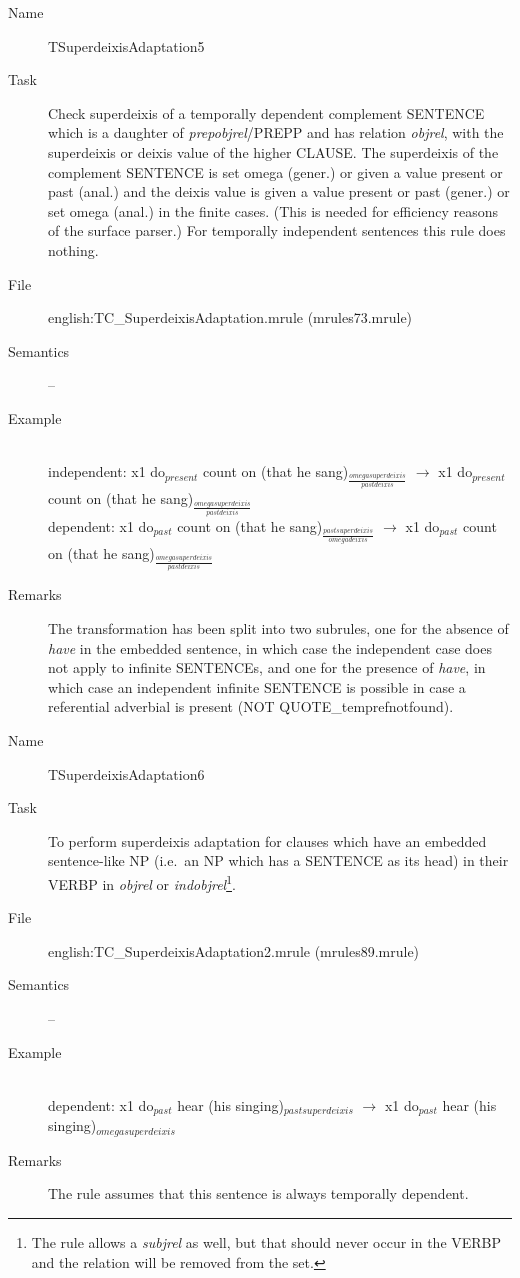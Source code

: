 \begin{description}
\vspace{1 cm}
\begin{description}
\item[Name] TSuperdeixisAdaptation5
\item[Task] 
Check superdeixis of a temporally dependent complement SENTENCE which is a 
daughter of {\em prepobjrel}/PREPP and has relation {\em objrel},
 with the superdeixis or 
deixis value of the higher CLAUSE.
The superdeixis of the complement SENTENCE is set omega (gener.) or given a 
value present or past (anal.) and the deixis value is given a value present or 
past (gener.) or
set omega (anal.) in the finite cases. (This is needed for efficiency 
reasons of the surface parser.) For temporally independent sentences this rule 
does nothing. 
\item[File] english:TC\_SuperdeixisAdaptation.mrule (mrules73.mrule)
\item[Semantics] --
\item[Example] \mbox{}\\
independent: x1 do$_{present}$ count on (that he 
sang)$_{\frac{omegasuperdeixis}{pastdeixis}}$ $\rightarrow$
x1 do$_{present}$ count on (that he 
sang)$_{\frac{omegasuperdeixis}{pastdeixis}}$ 
\\
dependent: x1 do$_{past}$ count on (that he 
sang)$_{\frac{pastsuperdeixis}{omegadeixis}}$ $\rightarrow$
x1 do$_{past}$ count on (that he 
sang)$_{\frac{omegasuperdeixis}{pastdeixis}}$ 
\item[Remarks] 
The transformation has been split into two subrules, one for the 
absence of {\em have} in the embedded sentence, in which case the independent 
case does not apply 
to infinite SENTENCEs, and one for the presence of {\em have}, in which 
case an independent infinite SENTENCE is possible in case a referential 
adverbial is present (NOT QUOTE\_temprefnotfound).
\end{description}

\vspace{1 cm}
\begin{description}
\item[Name]   TSuperdeixisAdaptation6
\item[Task] To perform superdeixis adaptation for clauses which have an 
embedded sentence-like NP (i.e.\ an NP which has a SENTENCE as its head) 
in their VERBP in {\em objrel\/} or {\em indobjrel\/}\footnote{The rule allows 
a {\em subjrel\/} as well, but that should never occur in the VERBP and the 
relation will be removed from the set.}. 
\item[File] english:TC\_SuperdeixisAdaptation2.mrule (mrules89.mrule)
\item[Semantics] --
\item[Example] \mbox{}\\
dependent: 
x1 do$_{past}$ hear (his singing)$_{pastsuperdeixis}$ $\rightarrow$
x1 do$_{past}$ hear (his singing)$_{omegasuperdeixis}$
\item[Remarks] 
The rule assumes that this sentence is always temporally dependent.
\end{description}


\end{description}
